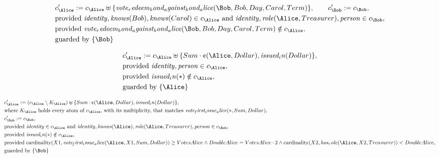 \begin{align*}
&
c'_
{
\Alice
}
 := 
c_
{
\Alice
}
 \uplus 
\{
\mathit{
vote_redeem_bond_against_bond_alice
}
(
\Bob
,
Bob
,
Day
,
Carol
,
Term
)
\}
, \qquad 
c'_
{
\Bob
}
 := 
c_
{
\Bob
}
,\\
&
\text{provided } 
\mathit{
identity
}
,
\mathit{
knows
}
(
Bob
)
,
\mathit{
knows
}
(
Carol
)
 \in c_
{
\Alice
}
 \text{ and } 
\mathit{
identity
}
,
\mathit{
role
}
(
\Alice
,
Treasurer
)
,
\mathit{
person
}
 \in c_
{
\Bob
}
,\\
&
\text{provided } 
\mathit{
vote_redeem_bond_against_bond_alice
}
(
\Bob
,
Bob
,
Day
,
Carol
,
Term
)
 \notin c_
{
\Alice
}
,\\
&
\text{guarded by } \{
\Bob
\}
\end{align*}

\begin{align*}
&
c'_
{
\Alice
}
 := 
c_
{
\Alice
}
 \uplus 
\{
Sum
\cdot
\text{\textcent}
(
\Alice
,
Dollar
)
,
\mathit{
issued_in
}
(
Dollar
)
\}
,\\
&
\text{provided } 
\mathit{
identity
}
,
\mathit{
person
}
 \in c_
{
\Alice
}
,\\
&
\text{provided } 
\mathit{
issued_in
}
(
\ast
)
 \notin c_
{
\Alice
}
,\\
&
\text{guarded by } \{
\Alice
\}
\end{align*}

\begin{align*}
&
c'_
{
\Alice
}
 := 
(
c_
{
\Alice
}
 \setminus K_
{
\Alice
}
) \uplus 
\{
Sum
\cdot
\text{\textcent}
(
\Alice
,
Dollar
)
,
\mathit{
issued_in
}
(
Dollar
)
\}
,\\
&
\text{where } K_
{
\Alice
}
 \text{ holds every atom of } c_
{
\Alice
}
 \text{, with its multiplicity, that matches } 
\mathit{
vote_first_issue_alice
}
(
\ast
,
Sum
,
Dollar
)
,\\
&
c'_
{
\Bob
}
 := 
c_
{
\Bob
}
,\\
&
\text{provided } 
\mathit{
identity
}
 \in c_
{
\Alice
}
 \text{ and } 
\mathit{
identity
}
,
\mathit{
knows
}
(
\Alice
)
,
\mathit{
role
}
(
\Alice
,
Treasurer
)
,
\mathit{
person
}
 \in c_
{
\Bob
}
,\\
&
\text{provided } 
\mathit{
issued_in
}
(
\ast
)
 \notin c_
{
\Alice
}
,\\
&
\text{provided } 
\mathrm{cardinality}(
X1
,
\mathit{
vote_first_issue_alice
}
(
\Alice
,
X1
,
Sum
,
Dollar
)
)
\ge
VotesAlice
\land
DoubleAlice
=
VotesAlice
\cdot
2
\land
\mathrm{cardinality}(
X2
,
\mathit{
has_role
}
(
\Alice
,
X2
,
Treasurer
)
)
<
DoubleAlice
,\\
&
\text{guarded by } \{
\Bob
\}
\end{align*}
